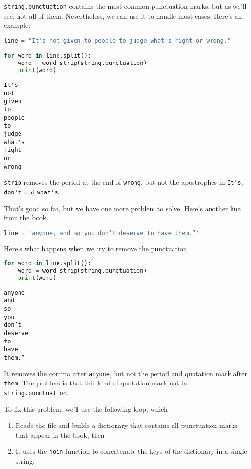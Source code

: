 \passthrough{\lstinline!string.punctuation!} contains the most common
punctuation marks, but as we'll see, not all of them. Nevertheless, we
can use it to handle most cases. Here's an example:

\begin{lstlisting}[language=Python]
line = "It's not given to people to judge what's right or wrong."

for word in line.split():
    word = word.strip(string.punctuation)
    print(word)
\end{lstlisting}

\begin{lstlisting}[]
It's
not
given
to
people
to
judge
what's
right
or
wrong
\end{lstlisting}

\passthrough{\lstinline!strip!} removes the period at the end of
\passthrough{\lstinline!wrong!}, but not the apostrophes in
\passthrough{\lstinline!It's!}, \passthrough{\lstinline!don't!} and
\passthrough{\lstinline!what's!}.

That's good so far, but we have one more problem to solve. Here's
another line from the book.

\begin{lstlisting}[language=Python]
line = 'anyone, and so you don’t deserve to have them.”'
\end{lstlisting}

Here's what happens when we try to remove the punctuation.

\begin{lstlisting}[language=Python]
for word in line.split():
    word = word.strip(string.punctuation)
    print(word)
\end{lstlisting}

\begin{lstlisting}[]
anyone
and
so
you
don’t
deserve
to
have
them.”
\end{lstlisting}

It removes the comma after \passthrough{\lstinline!anyone!}, but not the
period and quotation mark after \passthrough{\lstinline!them!}. The
problem is that this kind of quotation mark not in
\passthrough{\lstinline!string.punctuation!}.

To fix this problem, we'll use the following loop, which

\begin{enumerate}
\def\labelenumi{\arabic{enumi}.}
\item
  Reads the file and builds a dictionary that contains all punctuation
  marks that appear in the book, then
\item
  It uses the \passthrough{\lstinline!join!} function to concatenate the
  keys of the dictionary in a single string.
\end{enumerate}

